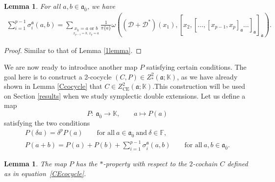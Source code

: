 \documentclass[pdftex]{sigma}
\numberwithin{equation}{section}
\newtheorem{Lemma}[Theorem]{Lemma}
\begin{document}
\begin{Lemma} \label{sigmabra} For all $a,b\in \mathfrak{a}_{\bar 0}$, we have
\begin{gather*}
 \sum_{i=1}^{p-1}\sigma_i^{\mathfrak{a}}(a,b)=\sum_{\underset{x_{p-1}=b,~x_p=a}{x_k=a \text{ or } b}}\frac{1}{\pi\{a\}}\omega( ({\mathscr D}+{\mathscr D}^*)(x_1),[x_2,[\dots ,[x_{p-1},x_p]_{\mathfrak{a}}\dots ]_{\mathfrak{a}}]_{\mathfrak{a}} ).
\end{gather*}
\end{Lemma}
\begin{proof}
Similar to that of Lemma \ref{1lemma}.
\end{proof}
We are now ready to introduce another map $P$ satisfying certain conditions. The goal here is to construct a 2-cocycle $(C,P)\in Z^2_*(\mathfrak{a}; \mathbb K)$, as we have already shown in Lemma \ref{Ccocycle} that $C\in Z^2_{\text{CE}}(\mathfrak{a}; \mathbb K)$.This construction will be used on Section \ref{results} when we study symplectic double extensions. Let us define a map \begin{equation}
 \label{mapP} P\colon\ \mathfrak{a}_{\bar 0} \rightarrow \mathbb K, \qquad a\mapsto P(a)
 \end{equation}
satisfying the two conditions
\begin{gather}
P(\delta a) = \delta^p P(a)\qquad \text{for all}\ a \in \mathfrak{a}_{\bar 0}\ \text{and}\ \delta\in \mathbb F,\label{CondP1}\\
P(a+b) = P(a)+P(b)+ \sum_{i=1}^{p-1}\sigma_i^{\mathfrak{a}}(a,b) \qquad \text{for all} \ a, b \in \mathfrak{a}_{\bar 0}.\label{CondP2}
 \end{gather}

 \begin{Lemma} \label{*property}
The map $P$ has the $*$-property with respect to the $2$-cochain $C$ defined as in equation~\eqref{CEcocycle}.
\end{Lemma}
\end{document}
